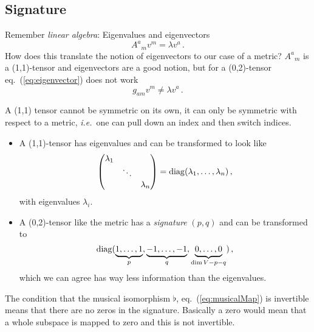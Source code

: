 \subsection{Signature}
Remember \textit{linear algebra}:
Eigenvalues and eigenvectors
\begin{equation}
    A^a{}_m v^m = \lambda v^a\,.
    \label{eq:eigenvector}
\end{equation}
How does this translate the notion of eigenvectors to our case of a metric?
$A^a{}_m$ is a (1,1)-tensor and eigenvectors are a good notion,
but for a (0,2)-tensor eq.~(\ref{eq:eigenvector}) does not work
\begin{equation}
    g_{am}v^m \neq \lambda v^a\,.
\end{equation}
\begin{note}
    A (1,1) tensor cannot be symmetric on its own, it can only be symmetric
    with respect to a metric, \textit{i.e.}\ one can pull down an index
    and then switch indices.
\end{note}
\begin{itemize}
    \item A (1,1)-tensor has eigenvalues and can be transformed to look like
        \begin{equation}
            \begin{pmatrix}
                \lambda_1 & & \\
                & \ddots & \\
                & & \lambda_n
            \end{pmatrix} = \operatorname{diag}(\lambda_1, \ldots, \lambda_n)\,,
        \end{equation}
        with eigenvalues $\lambda_i$.
    \item A (0,2)-tensor like the metric has a \textit{signature} $(p,q)$ and can be transformed to
        \begin{equation}
            \operatorname{diag}(\underbrace{1,\dots, 1}_{p}, \underbrace{-1, \ldots, -1}_{q}, 
            \underbrace{0, \ldots, 0}_{\dim V - p - q})\,,
        \end{equation}
        which we can agree has way less information than the eigenvalues.
\end{itemize}
\begin{note}
    The condition that the musical isomorphism $\flat$, eq.~(\ref{eq:musicalMap})
    is invertible means that there are no zeros in the signature. 
    Basically a zero would mean that a whole subspace is mapped to zero and
    this is not invertible.
\end{note}

